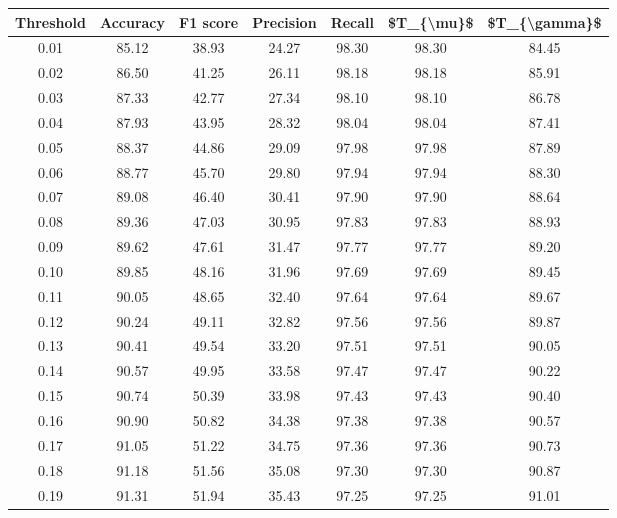 \begin{tabular}{|c|c|c|c|c|c|c|}
\hline
 Threshold &  Accuracy &  F1 score &  Precision &  Recall &  \$T\_\{\textbackslash mu\}\$ &  \$T\_\{\textbackslash gamma\}\$ \\
\hline
      0.01 &     85.12 &     38.93 &      24.27 &   98.30 &      98.30 &         84.45 \\
      0.02 &     86.50 &     41.25 &      26.11 &   98.18 &      98.18 &         85.91 \\
      0.03 &     87.33 &     42.77 &      27.34 &   98.10 &      98.10 &         86.78 \\
      0.04 &     87.93 &     43.95 &      28.32 &   98.04 &      98.04 &         87.41 \\
      0.05 &     88.37 &     44.86 &      29.09 &   97.98 &      97.98 &         87.89 \\
      0.06 &     88.77 &     45.70 &      29.80 &   97.94 &      97.94 &         88.30 \\
      0.07 &     89.08 &     46.40 &      30.41 &   97.90 &      97.90 &         88.64 \\
      0.08 &     89.36 &     47.03 &      30.95 &   97.83 &      97.83 &         88.93 \\
      0.09 &     89.62 &     47.61 &      31.47 &   97.77 &      97.77 &         89.20 \\
      0.10 &     89.85 &     48.16 &      31.96 &   97.69 &      97.69 &         89.45 \\
      0.11 &     90.05 &     48.65 &      32.40 &   97.64 &      97.64 &         89.67 \\
      0.12 &     90.24 &     49.11 &      32.82 &   97.56 &      97.56 &         89.87 \\
      0.13 &     90.41 &     49.54 &      33.20 &   97.51 &      97.51 &         90.05 \\
      0.14 &     90.57 &     49.95 &      33.58 &   97.47 &      97.47 &         90.22 \\
      0.15 &     90.74 &     50.39 &      33.98 &   97.43 &      97.43 &         90.40 \\
      0.16 &     90.90 &     50.82 &      34.38 &   97.38 &      97.38 &         90.57 \\
      0.17 &     91.05 &     51.22 &      34.75 &   97.36 &      97.36 &         90.73 \\
      0.18 &     91.18 &     51.56 &      35.08 &   97.30 &      97.30 &         90.87 \\
      0.19 &     91.31 &     51.94 &      35.43 &   97.25 &      97.25 &         91.01 \\

\end{tabular}
